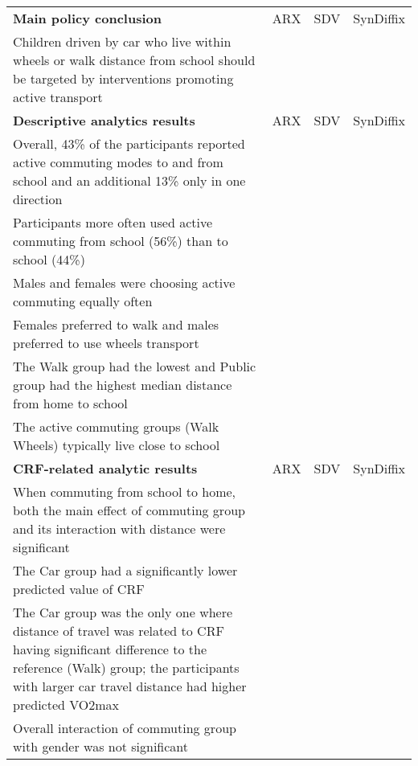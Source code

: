 \documentclass[10pt]{article}
\newcommand{\cmark}{\textcolor{green}{\ding{51}}}  %
\newcommand{\xmark}{\textcolor{red}{\ding{55}}}    %
\newcommand{\omark}{\textcolor{yellow}{\ding{109}}} %
\newcommand{\cmark}{\textbf{O }}
\newcommand{\xmark}{\textbf{X }}
\newcommand{\omark}{? }
\begin{document}
\begin{table}
\begin{center}
\begin{small}
\begin{tabularx}{\textwidth}{Xlll}
\toprule
\textbf{Main policy conclusion}  & ARX & SDV & SynDiffix \\
Children driven by car who live
within wheels or walk distance from school should be targeted by interventions promoting active transport & \cmark & \xmark & \cmark \\
\midrule
\textbf{Descriptive analytics results}  & ARX & SDV & SynDiffix \\
Overall, 43\% of the participants reported active commuting modes to and from school and an additional 13\%
only in one direction & \cmark & \xmark & \cmark \\
Participants more often used active commuting from school (56\%) than to school (44\%) & \cmark & \cmark & \cmark \\
Males and females were choosing active commuting equally often & \cmark & \cmark & \cmark \\
Females preferred to walk and males preferred to use wheels transport & \cmark & \xmark & \cmark \\
The Walk group had the lowest and Public group had the highest median distance from home to school & \cmark & \xmark & \cmark \\
The active commuting groups (Walk Wheels) typically live close to school & \cmark & \xmark & \cmark \\
\midrule
\textbf{CRF-related analytic results}  & ARX & SDV & SynDiffix \\
When commuting from school to home, both the main effect of commuting group and its interaction with
distance were significant & \cmark & \xmark & \cmark \\
The Car group had a significantly lower predicted value of CRF & \cmark & \xmark & \cmark \\
The Car group was the only one where distance of travel was related to CRF having significant difference to the reference (Walk) group; the participants with larger car travel distance had higher predicted VO2max & \cmark & \xmark & \omark \\
Overall interaction of commuting group with gender was not significant  & \omark & \cmark & \omark \\

\end{tabularx}
\end{small}
\end{center}
\end{table}
\end{document}
